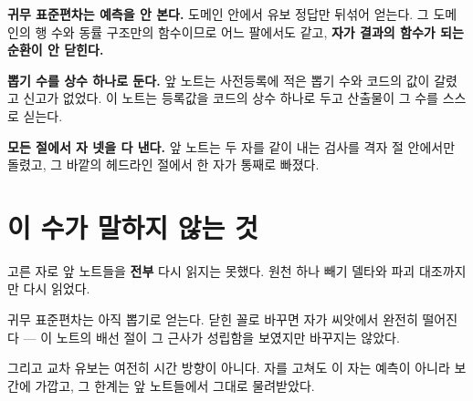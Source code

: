 \documentclass[10pt]{article}
\begin{document}
\textbf{귀무 표준편차는 예측을 안 본다.} 도메인 안에서 유보 정답만 뒤섞어 얻는다.
그 도메인의 행 수와 동률 구조만의 함수이므로 어느 팔에서도 같고,
\textbf{자가 결과의 함수가 되는 순환이 안 닫힌다.}

\textbf{뽑기 수를 상수 하나로 둔다.} 앞 노트는 사전등록에 적은 뽑기 수와
코드의 값이 갈렸고 신고가 없었다. 이 노트는 등록값을 코드의 상수 하나로 두고
산출물이 그 수를 스스로 싣는다.

\textbf{모든 절에서 자 넷을 다 낸다.} 앞 노트는 두 자를 같이 내는 검사를
격자 절 안에서만 돌렸고, 그 바깥의 헤드라인 절에서 한 자가 통째로 빠졌다.



\section{이 수가 말하지 않는 것}

고른 자로 앞 노트들을 \textbf{전부} 다시 읽지는 못했다. 원천 하나 빼기 델타와
파괴 대조까지만 다시 읽었다.

귀무 표준편차는 아직 뽑기로 얻는다. 닫힌 꼴로 바꾸면 자가 씨앗에서 완전히 떨어진다 ---
이 노트의 배선 절이 그 근사가 성립함을 보였지만 바꾸지는 않았다.

그리고 교차 유보는 여전히 시간 방향이 아니다. 자를 고쳐도 이 자는 예측이 아니라
보간에 가깝고, 그 한계는 앞 노트들에서 그대로 물려받았다.
\end{document}
